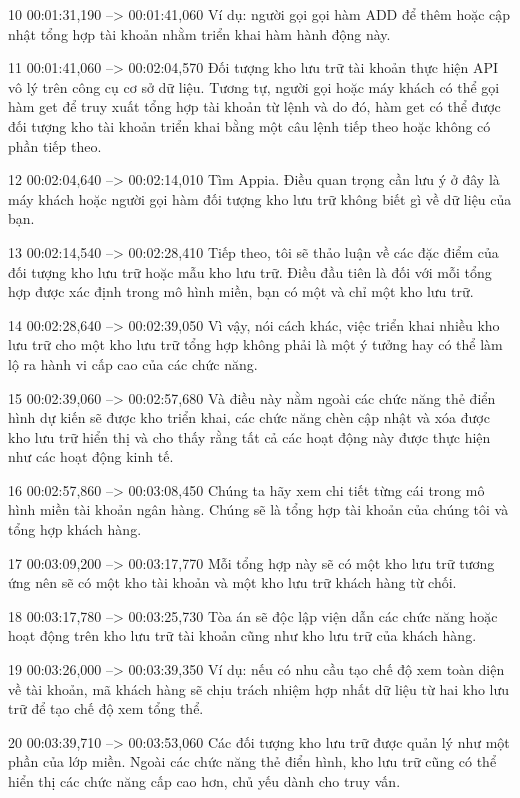 10
00:01:31,190 --> 00:01:41,060
Ví dụ: người gọi gọi hàm ADD để thêm hoặc cập nhật tổng hợp tài khoản nhằm triển khai hàm hành động này.

11
00:01:41,060 --> 00:02:04,570
Đối tượng kho lưu trữ tài khoản thực hiện API vô lý trên công cụ cơ sở dữ liệu.  Tương tự, người gọi hoặc máy khách có thể gọi hàm get để truy xuất tổng hợp tài khoản từ lệnh và do đó, hàm get có thể được đối tượng kho tài khoản triển khai bằng một câu lệnh tiếp theo hoặc không có phần tiếp theo.

12
00:02:04,640 --> 00:02:14,010
Tìm Appia.  Điều quan trọng cần lưu ý ở đây là máy khách hoặc người gọi hàm đối tượng kho lưu trữ không biết gì về dữ liệu của bạn.

13
00:02:14,540 --> 00:02:28,410
Tiếp theo, tôi sẽ thảo luận về các đặc điểm của đối tượng kho lưu trữ hoặc mẫu kho lưu trữ.  Điều đầu tiên là đối với mỗi tổng hợp được xác định trong mô hình miền, bạn có một và chỉ một kho lưu trữ.

14
00:02:28,640 --> 00:02:39,050
Vì vậy, nói cách khác, việc triển khai nhiều kho lưu trữ cho một kho lưu trữ tổng hợp không phải là một ý tưởng hay có thể làm lộ ra hành vi cấp cao của các chức năng.

15
00:02:39,060 --> 00:02:57,680
Và điều này nằm ngoài các chức năng thẻ điển hình dự kiến ​​sẽ được kho triển khai, các chức năng chèn cập nhật và xóa được kho lưu trữ hiển thị và cho thấy rằng tất cả các hoạt động này được thực hiện như các hoạt động kinh tế.

16
00:02:57,860 --> 00:03:08,450
Chúng ta hãy xem chi tiết từng cái trong mô hình miền tài khoản ngân hàng.  Chúng sẽ là tổng hợp tài khoản của chúng tôi và tổng hợp khách hàng.

17
00:03:09,200 --> 00:03:17,770
Mỗi tổng hợp này sẽ có một kho lưu trữ tương ứng nên sẽ có một kho tài khoản và một kho lưu trữ khách hàng từ chối.

18
00:03:17,780 --> 00:03:25,730
Tòa án sẽ độc lập viện dẫn các chức năng hoặc hoạt động trên kho lưu trữ tài khoản cũng như kho lưu trữ của khách hàng.

19
00:03:26,000 --> 00:03:39,350
Ví dụ: nếu có nhu cầu tạo chế độ xem toàn diện về tài khoản, mã khách hàng sẽ chịu trách nhiệm hợp nhất dữ liệu từ hai kho lưu trữ để tạo chế độ xem tổng thể.

20
00:03:39,710 --> 00:03:53,060
Các đối tượng kho lưu trữ được quản lý như một phần của lớp miền.  Ngoài các chức năng thẻ điển hình, kho lưu trữ cũng có thể hiển thị các chức năng cấp cao hơn, chủ yếu dành cho truy vấn.

